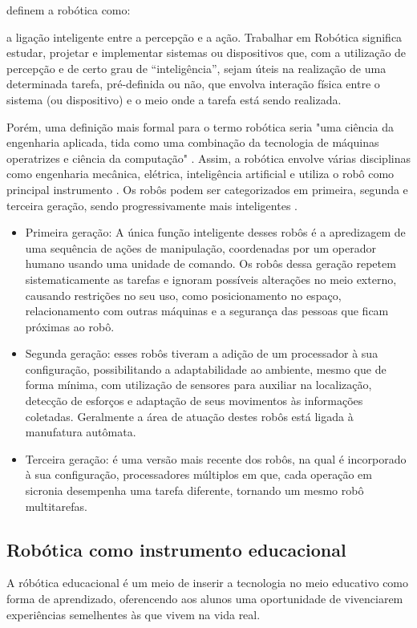 \cite{de2006robotica} definem a robótica como: 
\begin{citacao}
a ligação inteligente entre a percepção e a ação. Trabalhar em Robótica significa estudar, projetar e implementar sistemas ou dispositivos que, com a utilização de percepção e de certo grau de “inteligência”, sejam úteis na realização de uma determinada tarefa, pré-definida ou não, que envolva interação física entre o sistema (ou dispositivo) e o meio onde a tarefa está sendo realizada.
\end{citacao}
Porém, uma definição mais formal para o termo robótica seria "uma ciência da engenharia aplicada, tida como uma combinação da tecnologia de máquinas operatrizes e ciência da computação" . Assim, a robótica envolve várias disciplinas como engenharia mecânica, elétrica, inteligência artificial e utiliza o robô como principal instrumento \cite{curcio2008instituto}.
Os robôs podem ser categorizados em primeira, segunda e terceira geração, sendo progressivamente mais inteligentes .
\begin{itemize}
\item Primeira geração: A única função inteligente desses robôs é a apredizagem de uma sequência de ações de manipulação, coordenadas por um operador humano usando uma unidade de comando. Os robôs dessa geração repetem sistematicamente as tarefas e ignoram possíveis alterações no meio externo, causando restrições no seu uso, como posicionamento no espaço, relacionamento com outras máquinas e a segurança das pessoas que ficam próximas ao robô. 
\item Segunda geração: esses robôs tiveram a adição de um processador à sua configuração, possibilitando a adaptabilidade ao ambiente, mesmo que de forma mínima, com utilização de sensores para auxiliar na localização, detecção de esforços e adaptação de seus movimentos às informações coletadas. Geralmente a área de atuação destes robôs está ligada à manufatura autômata.
\item Terceira geração: é uma versão mais recente dos robôs, na qual é incorporado à sua configuração, processadores múltiplos em que, cada operação em sicronia desempenha uma tarefa diferente, tornando um mesmo robô multitarefas.	 
\end{itemize}

\subsection{Robótica como instrumento educacional}
A róbótica educacional é um meio de inserir a tecnologia no meio educativo como forma de aprendizado, oferencendo aos alunos uma oportunidade de vivenciarem experiências semelhentes às que vivem na vida real.
